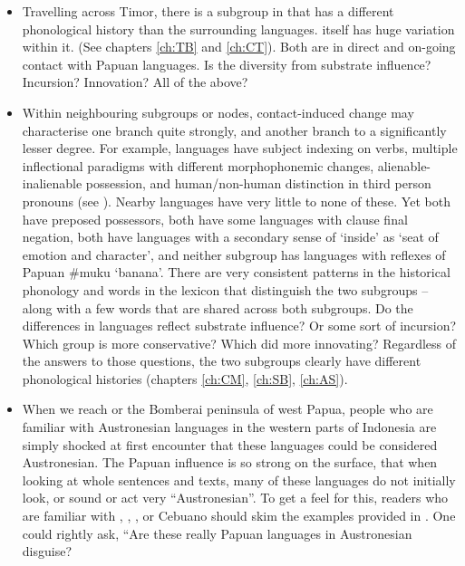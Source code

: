 \begin{itemize}
\item	Travelling across Timor,
there is a subgroup in  that has a different
phonological history than the surrounding  languages.
 itself has huge variation within it.
(See chapters \ref{ch:TB} and \ref{ch:CT}).
Both are in direct
and on-going contact with Papuan languages.
Is the diversity from substrate influence? Incursion? Innovation?
All of the above?

\item	Within neighbouring subgroups or nodes,
			contact-induced change may characterise one branch quite strongly,
			and another branch to a significantly lesser degree.
			For example,  languages have subject indexing
			on verbs, multiple inflectional paradigms with different morphophonemic
			changes, alienable-inalienable possession, and human/non-human distinction
			in third person pronouns (see ).
			Nearby  languages have very little to none of these.
			Yet both have preposed possessors,
			both have some languages with clause final negation,
			both have languages with a secondary sense of ‘inside’ as ‘seat
			of emotion and character’, and neither subgroup has languages with reflexes
			of Papuan {\#}muku ‘banana’.
			There are very consistent patterns in the historical phonology
			and words in the lexicon that distinguish the two subgroups -- along
			with a few words that are shared across both subgroups.
			Do the differences in  languages reflect substrate
			influence? Or some sort of incursion? Which group is more conservative?
			Which did more innovating? Regardless of the answers to those
			questions, the two subgroups clearly have different phonological
			histories (chapters \ref{ch:CM}, \ref{ch:SB}, \ref{ch:AS}).
\item	When we reach  or the Bomberai peninsula of west Papua,
			people who are familiar with Austronesian languages in the western
			parts of Indonesia are simply shocked at first encounter that
			these languages could be considered Austronesian.
			The Papuan influence is so strong on the surface,
			that when looking at whole sentences
			and texts, many of these languages do not initially look,
			or sound or act very “Austronesian”.
			To get a feel for this,
			readers who are familiar with ,
			, , or Cebuano should skim the  examples provided in \citet{Hughes2000}.
			One could rightly ask,
			“Are these really Papuan languages in Austronesian disguise?

\end{itemize}

